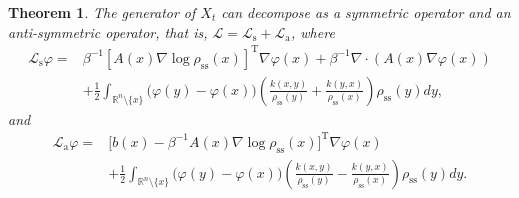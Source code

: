 \documentclass[10pt]{article}
\newtheorem{thm}{Theorem}[section]
\theoremstyle{definition}
\numberwithin{equation}{section}
\begin{document}
\begin{thm}
    The generator of $X_t$ can decompose as a symmetric operator and an anti-symmetric operator, that is, $\mathcal{L}=\mathcal{L}_\mathrm{s} + \mathcal{L}_\mathrm{a}$, where
    \begin{align}\label{op:Ls}
        \mathcal{L}_\mathrm{s}\varphi
        =& \beta^{-1}[A(x)\nabla\log\rho_\mathrm{ss}(x)]^\mathrm{T}\nabla\varphi(x) + \beta^{-1} \nabla\cdot (A(x)\nabla \varphi(x)) \nonumber \\
        &+ \frac{1}{2}\int_{\mathbb{R}^{n}\setminus\{x\}} \Big( \varphi(y)-\varphi(x) \Big) \left( \frac{k(x,y)}{\rho_\mathrm{ss}(y)} + \frac{k(y,x)}{\rho_\mathrm{ss}(x)} \right)\rho_\mathrm{ss}(y) dy,
    \end{align}
and    
\begin{align}\label{op:La}
     \mathcal{L}_\mathrm{a}\varphi=
    & \Big[ b(x)  - \beta^{-1}A(x)\nabla\log\rho_\mathrm{ss}(x) \Big]^\mathrm{T}\nabla \varphi(x) \nonumber \\
    &+ \frac{1}{2}\int_{\mathbb{R}^{n}\setminus\{x\}} \Big( \varphi(y)-\varphi(x) \Big) \left( \frac{k(x,y)}{\rho_\mathrm{ss}(y)} - \frac{k(y,x)}{\rho_\mathrm{ss}(x)} \right)\rho_\mathrm{ss}(y) dy.
\end{align}
\end{thm}
\end{document}
